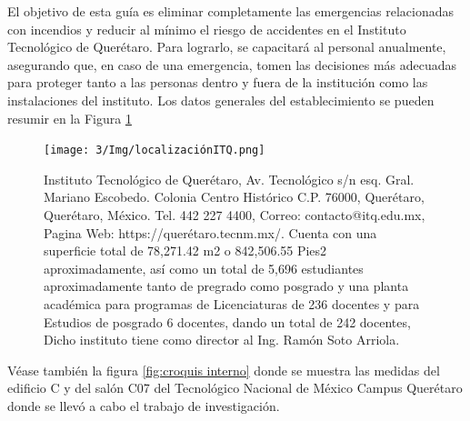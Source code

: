     El objetivo de esta guía es eliminar completamente las emergencias relacionadas con incendios y reducir al mínimo el riesgo de accidentes en el Instituto Tecnológico de Querétaro. Para lograrlo, se capacitará al personal anualmente, asegurando que, en caso de una emergencia, tomen las decisiones más adecuadas para proteger tanto a las personas dentro y fuera de la institución como las instalaciones del instituto. Los datos generales del establecimiento se pueden resumir en la Figura \ref{fig:localizaciónITQ}
    \begin{figure}[H]
        \centering
        \texttt{[image: 3/Img/localizaciónITQ.png]}
        \caption{Instituto Tecnológico de Querétaro, Av. Tecnológico s/n esq. Gral. Mariano Escobedo. Colonia Centro Histórico C.P. 76000, Querétaro, Querétaro, México. Tel. 442 227 4400, Correo: contacto@itq.edu.mx, Pagina Web: https://querétaro.tecnm.mx/. 
        Cuenta con una	superficie total de 78,271.42 m2 o 842,506.55 Pies2 aproximadamente, así como un total de 5,696 estudiantes aproximadamente tanto de pregrado como posgrado y una planta académica para programas de Licenciaturas de 236 docentes y para Estudios de posgrado 6 docentes, dando un total de 242 docentes, Dicho instituto tiene como director al Ing. Ramón Soto Arriola.}
        \label{fig:localizaciónITQ}
    \end{figure}
    Véase también la figura \ref{fig:croquis interno} donde se muestra las medidas del edificio C y del salón C07 del Tecnológico Nacional de México Campus Querétaro donde se llevó a cabo el trabajo de investigación.
